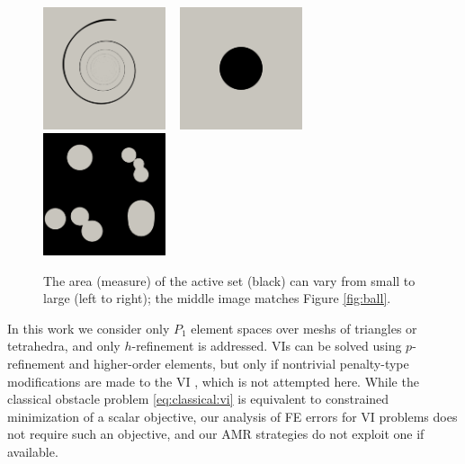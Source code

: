 \documentclass[]{interact}
\theoremstyle{plain}%
\theoremstyle{definition}
\theoremstyle{remark}
\begin{document}
\begin{figure}[ht]
\noindent \hspace{-1mm} \mbox{\includegraphics[width=0.32\textwidth]{static/spiral.png} \, \includegraphics[width=0.32\textwidth]{static/sphere.png} \, \includegraphics[width=0.32\textwidth]{static/blisters.png}}
\caption{The area (measure) of the active set (black) can vary from small to large (left to right); the middle image matches Figure \ref{fig:ball}.}
\label{fig:activesizes}
\end{figure}

In this work we consider only $P_1$ element spaces over meshs of triangles or tetrahedra, and only $h$-refinement is addressed.  VIs can be solved using $p$-refinement and higher-order elements, but only if nontrivial penalty-type modifications are made to the VI \cite{KeithSurowiec2024}, which is not attempted here.  While the classical obstacle problem \eqref{eq:classical:vi} is equivalent to constrained minimization of a scalar objective, our analysis of FE errors for VI problems does not require such an objective, and our AMR strategies do not exploit one if available.
\end{document}
